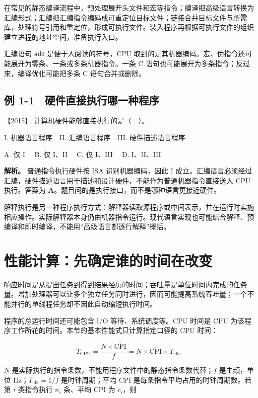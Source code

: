 在常见的静态编译流程中，预处理展开头文件和宏等指令；编译把高级语言转换为汇编形式；汇编把汇编指令编码成可重定位目标文件；链接合并目标文件与所需库，处理符号引用和重定位，形成可执行文件。装入程序再根据可执行文件的组织建立进程的地址空间，准备执行入口。

汇编语句 \allowbreak{}\texttt{add} 是便于人阅读的符号，CPU 取到的是其机器编码。宏、伪指令还可能展开为零条、一条或多条机器指令。一条 C 语句也可能展开为多条指令；反过来，编译优化可能把多条 C 语句合并或删除。

\subsection{例 1-1　硬件直接执行哪一种程序}\label{co-ex1-1}

\noindent{}【2015】 计算机硬件能够直接执行的是（　）。

I. 机器语言程序　II. 汇编语言程序　III. 硬件描述语言程序

A. 仅 I　 B. 仅 I、II　 C. 仅 I、III　 D. I、II、III


\textbf{解析。} 普通指令执行硬件按 ISA 识别机器编码，因此 I 成立。汇编语言必须经过汇编，硬件描述语言用于描述和设计硬件，不能作为普通机器指令直接送入 CPU 执行。答案为 \textbf{A}。题目问的是执行接口，而不是哪种语言更接近硬件。

解释执行是另一种程序执行方式：解释器读取源程序或中间表示，并在运行时实施相应操作。实际解释器本身仍由机器指令运行。现代语言实现也可能结合解释、预编译和即时编译，不能用``高级语言都逐行解释''概括。

\section{性能计算：先确定谁的时间在改变}\label{co-01-03}

响应时间是从提出任务到得到结果经历的时间；吞吐量是单位时间内完成的任务量。增加处理器可以让多个独立任务同时进行，因而可能提高系统吞吐量；一个不能并行的单线程任务却不因此自动缩短执行时间。

程序的总运行时间还可能包含 I/O 等待、系统调度等。CPU 时间是 CPU 为该程序工作所花的时间。本节的基本性能式只计算指定口径的 CPU 时间：

\[
T_{\mathrm{CPU}}=\frac{N\times\overline{\mathrm{CPI}}}{f}
=N\times\overline{\mathrm{CPI}}\times T_{\mathrm{clk}}.
\]

\(N\) 是实际执行的指令条数，不能用程序文件中的静态指令条数代替；\(f\) 是主频，单位 Hz；\(T_{\mathrm{clk}}=1/f\) 是时钟周期；平均 CPI 是每条指令平均占用的时钟周期数。若第 \(i\) 类指令执行 \(n_i\) 条、平均 CPI 为 \(c_i\)，则

